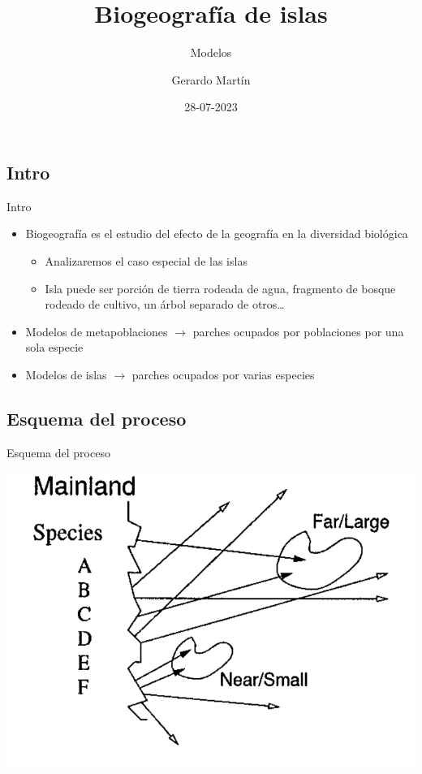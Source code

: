 \documentclass[
  11pt,
  ignorenonframetext,
]{beamer}
\title{Biogeografía de islas}
\subtitle{Modelos}
\author{Gerardo Martín}
\date{28-07-2023}
\begin{document}
\frame{\titlepage}

\hypertarget{intro}{%
\subsection{Intro}\label{intro}}

\begin{frame}{Intro}
\begin{itemize}
\item
  Biogeografía es el estudio del efecto de la geografía en la diversidad
  biológica

  \begin{itemize}
  \item
    Analizaremos el caso especial de las islas
  \item
    Isla puede ser porción de tierra rodeada de agua, fragmento de
    bosque rodeado de cultivo, un árbol separado de otros\ldots{}
  \end{itemize}
\item
  Modelos de metapoblaciones \(\rightarrow\) parches ocupados por
  poblaciones por una sola especie
\item
  Modelos de islas \(\rightarrow\) parches ocupados por varias especies
\end{itemize}
\end{frame}

\hypertarget{esquema-del-proceso}{%
\subsection{Esquema del proceso}\label{esquema-del-proceso}}

\begin{frame}{Esquema del proceso}
\begin{center}\includegraphics{Biogeografia/Islas} \end{center}
\end{frame}
\end{document}
